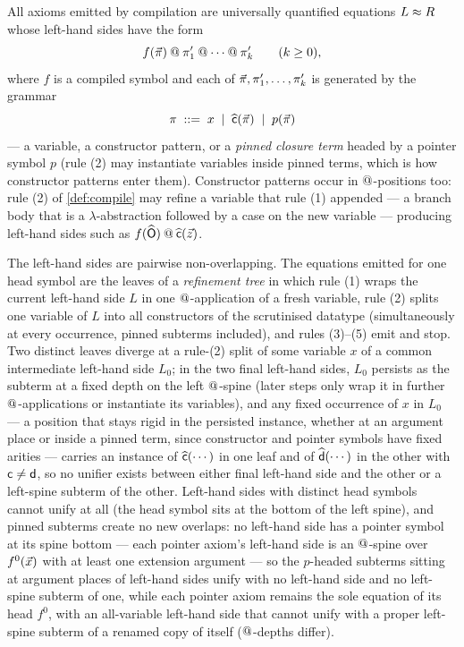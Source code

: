 \begin{remark}
\label{rem:eq-shape}
All axioms emitted by compilation are universally quantified equations
$L \approx R$ whose left-hand sides have the form
\[
  f(\vec{\pi}) \mathbin{@} \pi'_1 \mathbin{@} \cdots \mathbin{@} \pi'_k \qquad (k \geq 0),
\]
where $f$ is a compiled symbol and each of $\vec{\pi}, \pi'_1, \dots,
\pi'_k$ is generated by the grammar
\[
  \pi \;::=\; x \;\mid\; \widehat{\mathsf{c}}(\vec{\pi}) \;\mid\;
  p(\vec{\pi})
\]
--- a variable, a constructor pattern, or a \emph{pinned closure
term} headed by a pointer symbol $p$ (rule (2) may instantiate
variables inside pinned terms, which is how constructor patterns enter
them).  Constructor patterns occur in $\mathbin{@}$-positions too: rule (2)
of \cref{def:compile} may refine a variable that rule (1) appended ---
a branch body that is a $\lambda$-abstraction followed by a case on
the new variable --- producing left-hand sides such as $f(\widehat{\mathsf{O}})
\mathbin{@} \widehat{\mathsf{c}}(\vec{z})$.

The left-hand sides are pairwise non-overlapping.  The equations
emitted for one head symbol are the leaves of a \emph{refinement tree}
in which rule (1) wraps the current left-hand side $L$ in one
$\mathbin{@}$-application of a fresh variable, rule (2) splits one variable
of $L$ into all constructors of the scrutinised datatype
(simultaneously at every occurrence, pinned subterms included), and
rules (3)--(5) emit and stop.  Two distinct leaves diverge at a
rule-(2) split of some variable $x$ of a common intermediate left-hand
side $L_0$; in the two final left-hand sides, $L_0$ persists as the
subterm at a fixed depth on the left $\mathbin{@}$-spine (later steps only
wrap it in further $\mathbin{@}$-applications or instantiate its variables),
and any fixed occurrence of $x$ in $L_0$ --- a position that stays
rigid in the persisted instance, whether at an argument place or
inside a pinned term, since constructor and pointer symbols have fixed
arities --- carries an instance of $\widehat{\mathsf{c}}(\cdots)$ in one
leaf and of $\widehat{\mathsf{d}}(\cdots)$ in the other with $\mathsf{c} \neq
\mathsf{d}$, so no unifier exists between either final left-hand side
and the other or a left-spine subterm of the other.  Left-hand sides
with distinct head symbols cannot unify at all (the head symbol sits
at the bottom of the left spine), and pinned subterms create no new
overlaps: no left-hand side has a pointer symbol at its spine bottom
--- each pointer axiom's left-hand side is an $\mathbin{@}$-spine over
$f^0(\vec{x})$ with at least one extension argument --- so the
$p$-headed subterms sitting at argument places of left-hand sides
unify with no left-hand side and no left-spine subterm of one, while
each pointer axiom remains the sole equation of its head $f^0$, with
an all-variable left-hand side that cannot unify with a proper
left-spine subterm of a renamed copy of itself ($\mathbin{@}$-depths
differ).


\end{remark}
